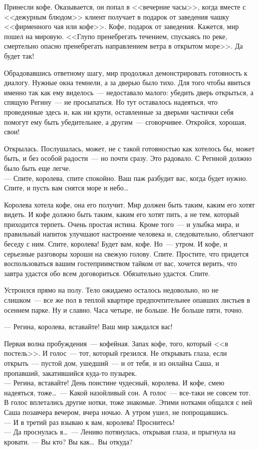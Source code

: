 Принесли кофе. Оказывается, он попал в <<вечерние часы>>, когда вместе с <<дежурным 
блюдом>> клиент получает в подарок от заведения чашку <<фирменного чая или кофе>>. 
Кофе, подарок от заведения. Кажется, мир пошел на мировую. <<Глупо пренебрегать 
течением, спускаясь по реке, смертельно опасно пренебрегать направлением ветра в 
открытом море>>. Да будет так!

Обрадовавшись ответному шагу, мир продолжал демонстрировать готовность к 
диалогу. Нужные окна темнели, а за дверью было тихо. Для того чтобы явиться 
именно так как ему виделось~--- недоставало малого: убедить дверь открыться, а 
спящую Регину~--- не просыпаться. Но тут оставалось надеяться, что проведенные 
здесь и, как ни крути, оставленные за дверьми частички себя помогут ему быть 
убедительнее, а другим~--- сговорчивее. Откройся, хорошая, свои!

Открылась. Послушалась, может, не с такой готовностью как хотелось бы, может 
быть, и без особой радости~--- но почти сразу. Это радовало. С Региной должно 
было 
быть еще легче.\\
--- Спите, королева, спите спокойно. Ваш паж разбудит вас, когда будет нужно. 
Спите, и пусть вам снятся море и небо\ldots

Королева хотела кофе, она его получит. Мир должен быть таким, каким его хотят 
видеть. И кофе должно быть таким, каким его хотят пить, а не тем, который 
приходится терпеть. Очень простая истина. Кроме того~--- и улыбка мира, и 
правильный напиток улучшают настроение человека и, следовательно, облегчают 
беседу с ним. Спите, королева! Будет вам, кофе. Но~--- утром. И кофе, и 
серьезные 
разговоры хороши на свежую голову. Спите. Простите, что придется воспользоваться 
вашим гостеприимством тайком от вас, хочется верить, что завтра удастся обо всем 
договориться. Обязательно удастся. Спите.

Устроился прямо на полу. Тело ожидаемо осталось недовольно, но не слишком~--- 
все 
же пол в теплой квартире предпочтительнее опавших листьев в осеннем парке. Ну и 
славно. Часа четыре, не больше. Не больше пяти, точно.

\newpage

\noindent --- Регина, королева, вставайте! Ваш мир заждался вас!

Первая волна пробуждения~--- кофейная. Запах кофе, того, который <<в постель>>. 
И 
голос~--- тот, который грезился. Не открывать глаза, если открыть~--- пустой 
дом, 
ушедший~--- и от тебя, и из онлайна Саша, и пропавший, закатившийся куда-то 
пузырек.\\
--- Регина, вставайте! День поистине чудесный, королева. И кофе, смею надеяться, 
тоже\ldots~--- Какой назойливый сон. А голос~--- все-таки не совсем тот. В 
голос 
вплетались другие нотки, тоже знакомые. Этими нотками общался с ней Саша 
позавчера вечером, вчера ночью. А утром ушел, не попрощавшись.\\
--- И в третий раз взываю к вам, королева! Проснитесь!\\
--- Да проснулась я\ldots~--- Лениво потянулась, открывая глаза, и прыгнула на 
кровати. 
--- Вы кто? Вы как\ldots\ Вы откуда?

